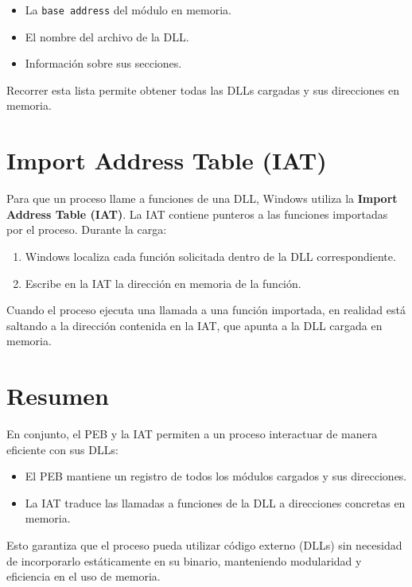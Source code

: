 \begin{itemize}
    \item La \texttt{base address} del módulo en memoria.
    \item El nombre del archivo de la DLL.
    \item Información sobre sus secciones.
\end{itemize}

Recorrer esta lista permite obtener todas las DLLs cargadas y sus direcciones en 
memoria.

\section{Import Address Table (IAT)}
Para que un proceso llame a funciones de una DLL, Windows utiliza la 
\textbf{Import Address Table (IAT)}. La IAT contiene punteros a las funciones 
importadas por el proceso. Durante la carga:

\begin{enumerate}
    \item Windows localiza cada función solicitada dentro de la DLL 
    correspondiente.
    \item Escribe en la IAT la dirección en memoria de la función.
\end{enumerate}

Cuando el proceso ejecuta una llamada a una función importada, en realidad está 
saltando a la dirección contenida en la IAT, que apunta a la DLL cargada en 
memoria.

\section{Resumen}
En conjunto, el PEB y la IAT permiten a un proceso interactuar de manera 
eficiente con sus DLLs:

\begin{itemize}
    \item El PEB mantiene un registro de todos los módulos cargados y sus 
    direcciones.
    \item La IAT traduce las llamadas a funciones de la DLL a direcciones 
    concretas en memoria.
\end{itemize}

Esto garantiza que el proceso pueda utilizar código externo (DLLs) sin necesidad 
de incorporarlo estáticamente en su binario, manteniendo modularidad y eficiencia 
en el uso de memoria.
